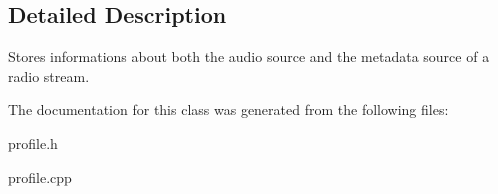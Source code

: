 \subsection{Detailed Description}
Stores informations about both the audio source and the metadata source of a radio stream. 

The documentation for this class was generated from the following files:\begin{DoxyCompactItemize}
\item 
profile.h\item 
profile.cpp\end{DoxyCompactItemize}
